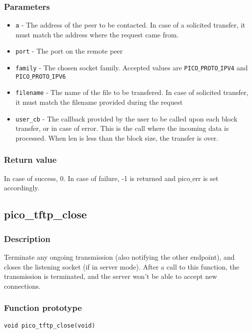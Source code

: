 \subsubsection*{Parameters}
\begin{itemize}[noitemsep]
\item \texttt{a} - The address of the peer to be contacted. In case of a solicited transfer, it must match the address where the request came from.
\item \texttt{port} - The port on the remote peer
\item \texttt{family} - The chosen socket family. Accepted values are \texttt{PICO$\_$PROTO$\_$IPV4} and \texttt{PICO$\_$PROTO$\_$IPV6}
\item \texttt{filename} - The name of the file to be transfered. In case of solicited transfer, it must match the filename provided during the request
\item \texttt{user\_cb} - The callback provided by the user to be called upon each block transfer, or in case of error. This is the call where the incoming data is processed. When len is less than the block size, the transfer is over.
\end{itemize}

\subsubsection*{Return value}
In case of success, 0. In case of failure, -1 is returned and pico$\_$err is set accordingly.



\subsection{pico\_tftp\_close}
\subsubsection*{Description}
Terminate any ongoing transmission (also notifying the other endpoint), and closes the listening socket (if in server mode).
After a call to this function, the transmission is terminated, and the server won't be able to accept new connections.

\subsubsection*{Function prototype}
\begin{verbatim}
void pico_tftp_close(void)
\end{verbatim}



